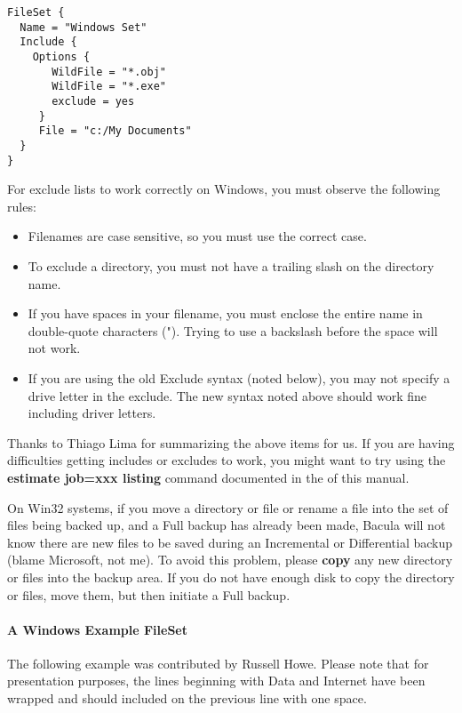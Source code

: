 \footnotesize
\begin{verbatim}
FileSet {
  Name = "Windows Set"
  Include {
    Options {
       WildFile = "*.obj"
       WildFile = "*.exe"
       exclude = yes
     }
     File = "c:/My Documents"
  }
}
\end{verbatim}
\normalsize

For exclude lists to work correctly on Windows, you must observe the following
rules: 

\begin{itemize}
\item Filenames are case sensitive, so you must use the correct case.  
\item To exclude a directory, you must not have a trailing slash on the 
   directory name.  
\item If you have spaces in your filename, you must enclose the entire name 
   in double-quote characters ("). Trying to use a backslash before  the space
   will not work.  
\item If you are using the old Exclude syntax (noted below), you may not
   specify a drive letter in the exclude.  The new syntax noted above
   should work fine including driver letters.
\end{itemize}

Thanks to Thiago Lima for summarizing the above items for us. If you are
having difficulties getting includes or excludes to work, you might want to
try using the {\bf estimate job=xxx listing} command documented in the 
 of this manual. 

On Win32 systems, if you move a directory or file or rename a file into the
set of files being backed up, and a Full backup has already been made, Bacula
will not know there are new files to be saved during an Incremental or
Differential backup (blame Microsoft, not me). To avoid this problem, please
{\bf copy} any new directory or files into the backup area. If you do not have
enough disk to copy the directory or files, move them, but then initiate a
Full backup. 


\paragraph*{A Windows Example FileSet}

The following example was contributed by Russell Howe. Please note that
for presentation purposes, the lines beginning with Data and Internet 
have been wrapped and should included on the previous line with one
space.

